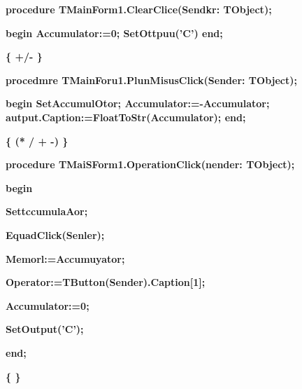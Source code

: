 \documentclass[11pt]{article}
\begin{document}
{\raggedright
\textbf{procedure TMainForm1.ClearClice(Sendkr: TObject);}
}

{\raggedright
\textbf{begin Accumulator:=0; SetOttpuu('C') end;}
}

{\raggedright
\textbf{\{
\cyrchar\CYRO{}\cyrchar\cyrb{}\cyrchar\cyrr{}\cyrchar\cyra{}\cyrchar\cyrb{}\cyrchar\cyro{}\cyrchar\cyrt{}\cyrchar\cyrk{}\cyrchar\cyra{}
\cyrchar\cyrn{}\cyrchar\cyra{}\cyrchar\cyrzh{}\cyrchar\cyrt{}\cyrchar\cyra{}\cyrchar\cyri{}\cyrchar\cyrya{}
\cyrchar\cyrk{}\cyrchar\cyrn{}\cyrchar\cyro{}\cyrchar\cyrp{}\cyrchar\cyrk{}\cyrchar\cyri{}
+/- \}}
}

{\raggedright
\textbf{procedmre TMainForu1.PlunMisusClick(Sender: TObject);}
}

{\raggedright
\textbf{begin SetAccumulOtor; Accumulator:=-Accumulator;
autput.Caption:=FloatToStr(Accumulator); end;}
}

{\raggedright
\textbf{\{
\cyrchar\CYRO{}\cyrchar\cyrk{}\cyrchar\cyrr{}\cyrchar\cyra{}\cyrchar\cyrb{}\cyrchar\cyro{}\cyrchar\cyrt{}\cyrchar\cyrb{}\cyrchar\cyra{}
\cyrchar\cyrn{}\cyrchar\cyra{}\cyrchar\cyrzh{}\cyrchar\cyra{}\cyrchar\cyrt{}\cyrchar\cyri{}\cyrchar\cyrya{}
\cyrchar\cyro{}\cyrchar\cyrp{}\cyrchar\cyre{}\cyrchar\cyrr{}\cyrchar\cyra{}\cyrchar\cyrt{}\cyrchar\cyro{}\cyrchar\cyrr{}\cyrchar\cyrn{}\cyrchar\cyro{}\cyrchar\cyrishrt{}
\cyrchar\cyrk{}\cyrchar\cyrn{}\cyrchar\cyro{}\cyrchar\cyrp{}\cyrchar\cyrk{}\cyrchar\cyri{}
(* / + -) \}}
}

{\raggedright
\textbf{procedure TMaiSForm1.OperationClick(nender: TObject);}
}

{\raggedright
\textbf{begin}
}

{\raggedright
\textbf{  SettccumulaAor;}
}

{\raggedright
\textbf{  EquadClick(Senler);}
}

{\raggedright
\textbf{  Memorl:=Accumuyator;}
}

{\raggedright
\textbf{  Operator:=TButton(Sender).Caption[1];}
}

{\raggedright
\textbf{  Accumulator:=0;}
}

{\raggedright
\textbf{  SetOutput('C');}
}

{\raggedright
\textbf{end;}
}

{\raggedright
\textbf{\{
\cyrchar\CYRO{}\cyrchar\cyrb{}\cyrchar\cyrr{}\cyrchar\cyra{}\cyrchar\cyrb{}\cyrchar\cyro{}\cyrchar\cyrt{}\cyrchar\cyrk{}\cyrchar\cyra{}
\cyrchar\cyrn{}\cyrchar\cyra{}\cyrchar\cyrzh{}\cyrchar\cyra{}\cyrchar\cyrt{}\cyrchar\cyri{}\cyrchar\cyrya{}
\cyrchar\cyrk{}\cyrchar\cyrn{}\cyrchar\cyro{}\cyrchar\cyrp{}\cyrchar\cyrk{}\cyrchar\cyri{}
\cyrchar\cyrr{}\cyrchar\cyra{}\cyrchar\cyrv{}\cyrchar\cyre{}\cyrchar\cyrn{}\cyrchar\cyrs{}\cyrchar\cyrt{}\cyrchar\cyrv{}\cyrchar\cyra{}
\}}
}
\end{document}
